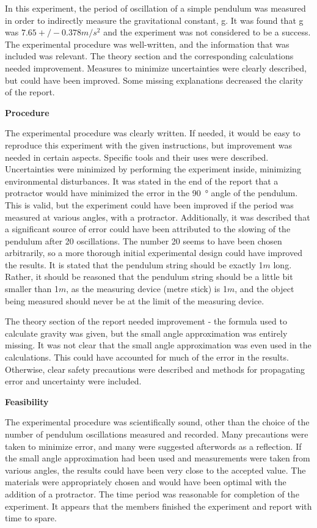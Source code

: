 In this experiment, the period of oscillation of a simple pendulum was measured in order to indirectly measure the gravitational constant, g. It was found that g was $\SI{7.65}+/- {0.378}{m/s^2}$ and the experiment was not considered to be a success. The experimental procedure was well-written, and the information that was included was relevant. The theory section and the corresponding calculations needed improvement. Measures to minimize uncertainties were clearly described, but could have been improved. Some missing explanations decreased the clarity of the report.

\textbf{Procedure}

The experimental procedure was clearly written. If needed, it would be easy to reproduce this experiment with the given instructions, but improvement was needed in certain aspects. Specific tools and their uses were described. Uncertainties were minimized by performing the experiment inside, minimizing environmental disturbances. It was stated in the end of the report that a protractor would have minimized the error in the \SI{90}{\degree} angle of the pendulum. This is valid, but the experiment could have been improved if the period was measured at various angles, with a protractor. Additionally, it was described that a significant source of error could have been attributed to the slowing of the pendulum after 20 oscillations. The number 20 seems to have been chosen arbitrarily, so a more thorough initial experimental design could have improved the results. It is stated that the pendulum string should be exactly 1$\si{m}$ long. Rather,  it should be reasoned that the pendulum string should be a little bit smaller than 1$\si{m}$, as the measuring device (metre stick) is 1$\si{m}$, and the object being measured should never be at the limit of the measuring device. 

The theory section of the report needed improvement - the formula used to calculate gravity was given, but the small angle approximation was entirely missing. It was not clear that the small angle approximation was even used in the calculations. This could have accounted for much of the error in the results. Otherwise, clear safety precautions were described and methods for propagating error and uncertainty were included.

\textbf{Feasibility}

The experimental procedure was scientifically sound, other than the choice of the number of pendulum oscillations measured and recorded. Many precautions were taken to minimize error, and many were suggested afterwords as a reflection. If the small angle approximation had been used and measurements were taken from various angles, the results could have been very close to the accepted value. The materials were appropriately chosen and would have been optimal with the addition of a protractor. The time period was reasonable for completion of the experiment. It appears that the members finished the experiment and report with time to spare. 

